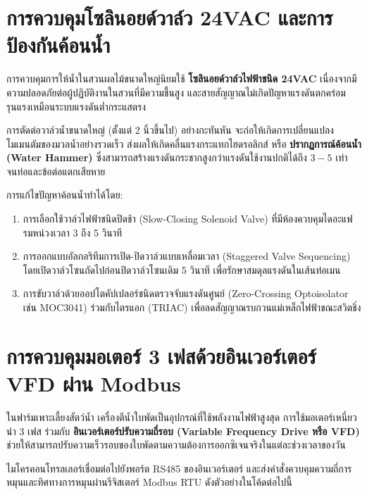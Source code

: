 \section{การควบคุมโซลินอยด์วาล์ว 24VAC และการป้องกันค้อนน้ำ}

การควบคุมการให้น้ำในสวนผลไม้ขนาดใหญ่นิยมใช้ \textbf{โซลินอยด์วาล์วไฟฟ้าชนิด 24VAC} เนื่องจากมีความปลอดภัยต่อผู้ปฏิบัติงานในสวนที่มีความชื้นสูง และสายสัญญาณไม่เกิดปัญหาแรงดันตกคร่อมรุนแรงเหมือนระบบแรงดันต่ำกระแสตรง

การตัดต่อวาล์วน้ำขนาดใหญ่ (ตั้งแต่ 2 นิ้วขึ้นไป) อย่างกะทันหัน จะก่อให้เกิดการเปลี่ยนแปลงโมเมนตัมของมวลน้ำอย่างรวดเร็ว ส่งผลให้เกิดคลื่นแรงกระแทกไฮดรอลิกส์ หรือ \textbf{ปรากฏการณ์ค้อนน้ำ (Water Hammer)} ซึ่งสามารถสร้างแรงดันกระชากสูงกว่าแรงดันใช้งานปกติได้ถึง $3 - 5$ เท่า จนท่อและข้อต่อแตกเสียหาย

\begin{theorybox}
การแก้ไขปัญหาค้อนน้ำทำได้โดย:
\begin{enumerate}[leftmargin=1.5em]
    \item การเลือกใช้วาล์วไฟฟ้าชนิดปิดช้า (Slow-Closing Solenoid Valve) ที่มีห้องควบคุมไดอะแฟรมหน่วงเวลา 3 ถึง 5 วินาที
    \item การออกแบบอัลกอริทึมการเปิด-ปิดวาล์วแบบเหลื่อมเวลา (Staggered Valve Sequencing) โดยเปิดวาล์วโซนถัดไปก่อนปิดวาล์วโซนเดิม 5 วินาที เพื่อรักษาสมดุลแรงดันในเส้นท่อเมน
    \item การขับวาล์วด้วยออปโตคัปเปลอร์ชนิดตรวจจับแรงดันศูนย์ (Zero-Crossing Optoisolator เช่น MOC3041) ร่วมกับไตรแอก (TRIAC) เพื่อลดสัญญาณรบกวนแม่เหล็กไฟฟ้าขณะสวิตชิ่ง
\end{enumerate}
\end{theorybox}

\section{การควบคุมมอเตอร์ 3 เฟสด้วยอินเวอร์เตอร์ VFD ผ่าน Modbus}

ในฟาร์มเพาะเลี้ยงสัตว์น้ำ เครื่องตีน้ำใบพัดเป็นอุปกรณ์ที่ใช้พลังงานไฟฟ้าสูงสุด การใช้มอเตอร์เหนี่ยวนำ 3 เฟส ร่วมกับ \textbf{อินเวอร์เตอร์ปรับความถี่รอบ (Variable Frequency Drive หรือ VFD)} ช่วยให้สามารถปรับความเร็วรอบของใบพัดตามความต้องการออกซิเจนจริงในแต่ละช่วงเวลาของวัน

ไมโครคอนโทรลเลอร์เชื่อมต่อไปยังพอร์ต RS485 ของอินเวอร์เตอร์ และส่งคำสั่งควบคุมความถี่การหมุนและทิศทางการหมุนผ่านรีจิสเตอร์ Modbus RTU ดังตัวอย่างในโค้ดต่อไปนี้

